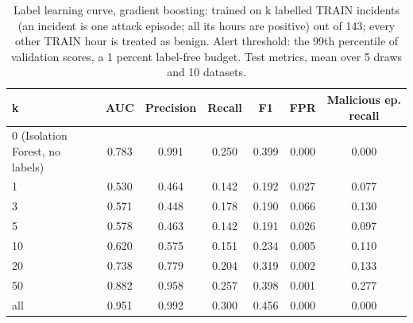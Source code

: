 \begin{table}[t]
\centering
\scriptsize
\caption{Label learning curve, gradient boosting: trained on k labelled TRAIN incidents (an incident is one attack episode; all its hours are positive) out of 143; every other TRAIN hour is treated as benign. Alert threshold: the 99th percentile of validation scores, a 1 percent label-free budget. Test metrics, mean over 5 draws and 10 datasets.}
\label{tab:lc-boosting-b1}
\begin{tabular}{lcccccc}
\hline
k & AUC & Precision & Recall & F1 & FPR & Malicious ep. recall \\
\hline
0 (Isolation Forest, no labels) & 0.783 & 0.991 & 0.250 & 0.399 & 0.000 & 0.000 \\
1 & 0.530 & 0.464 & 0.142 & 0.192 & 0.027 & 0.077 \\
3 & 0.571 & 0.448 & 0.178 & 0.190 & 0.066 & 0.130 \\
5 & 0.578 & 0.463 & 0.142 & 0.191 & 0.026 & 0.097 \\
10 & 0.620 & 0.575 & 0.151 & 0.234 & 0.005 & 0.110 \\
20 & 0.738 & 0.779 & 0.204 & 0.319 & 0.002 & 0.133 \\
50 & 0.882 & 0.958 & 0.257 & 0.398 & 0.001 & 0.277 \\
all & 0.951 & 0.992 & 0.300 & 0.456 & 0.000 & 0.000 \\
\hline
\end{tabular}
\end{table}
